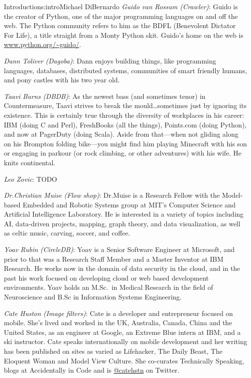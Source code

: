 \begin{aosachapter}{Introduction}{s:intro}{Michael DiBernardo}
\emph{Guido van Rossum (Crawler)}: Guido is the creator of Python, one of the major programming languages on and off the web. The Python community refers to him as the BDFL (Benevolent Dictator For Life), a title straight from a Monty Python skit.  Guido's home on the web is \url{www.python.org/~guido/}.

\emph{Dann Toliver (Dagoba)}: Dann enjoys building things, like programming languages, databases, distributed systems, communities of smart friendly humans, and pony castles with his two year old.

\emph{Taavi Burns (DBDB)}: As the newest bass (and sometimes tenor) in Countermeasure, Taavi strives to break the mould\ldots sometimes just by ignoring its existence. This is certainly true through the diversity of workplaces in his career: IBM (doing C and Perl), FreshBooks (all the things), Points.com (doing Python), and now at PagerDuty (doing Scala).  Aside from that—when not gliding along on his Brompton folding bike—you might find him playing Minecraft with his son or engaging in parkour (or rock climbing, or other adventures) with his wife. He knits continental.

\emph{Leo Zovic}: TODO

\emph{Dr.\@ Christian Muise (Flow shop)}: Dr.\@ Muise is a Research Fellow with the Model-based Embedded and Robotic Systems group at MIT's Computer Science and Artificial Intelligence Laboratory. He is interested in a variety of topics including AI, data-driven projects, mapping, graph theory, and data visualization, as well as celtic music, carving, soccer, and coffee.

\emph{Yoav Rubin (CircleDB)}: Yoav is a Senior Software Engineer at Microsoft, and prior to that was a Research Staff Member and a Master Inventor at IBM Research. He works now in the domain of data security in the cloud, and in the past his work focused on developing cloud or web based development environments. Yoav holds an M.Sc.\ in Medical Research in the field of Neuroscience and B.Sc in Information Systems Engineering. 

\emph{Cate Huston (Image filters)}: Cate is a developer and entrepreneur focused on mobile. She’s lived and worked in the UK, Australia, Canada, China and the United States, as an engineer at Google, an Extreme Blue intern at IBM, and a ski instructor. Cate speaks internationally on mobile development and her writing has been published on sites as varied as Lifehacker, The Daily Beast, The Eloquent Woman and Model View Culture. She co-curates Technically Speaking, blogs at Accidentally in Code and is \url{@catehstn} on Twitter.


\end{aosachapter}

